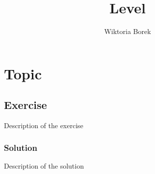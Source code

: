 \documentclass{article}
\title{Level}
\author{Wiktoria Borek}
\date{}
\begin{document}
\maketitle

\section{Topic}
\subsection{Exercise}
Description of the exercise
\subsubsection*{Solution}
Description of the solution
\end{document}
